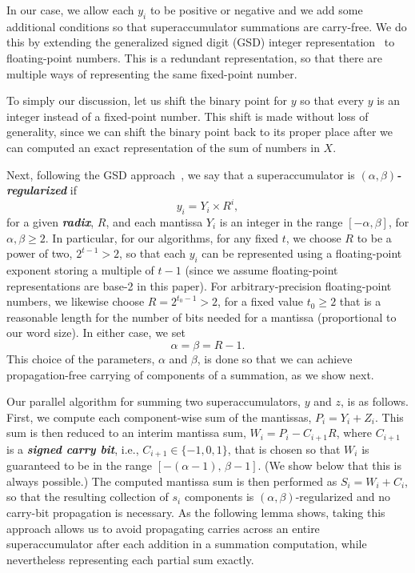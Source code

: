 \documentclass[11pt]{article}
\renewcommand{\emph}[1]{\textit{\textbf{#1}}}
\begin{document}
In our case, 
we allow each $y_i$ to be positive or negative and we 
add some additional conditions so that 
superaccumulator summations are carry-free.
We do this by extending the generalized signed digit (GSD) 
integer representation~\cite{P46283} to floating-point numbers.
This is a redundant representation, so that there are multiple
ways of representing the same fixed-point number.

To simply our discussion, let us shift the binary point for $y$ so that every
$y$ is an integer instead of a fixed-point number.
This shift is made without loss of generality, since we can shift
the binary point back to its proper place after we can computed an
exact representation of the sum of numbers in $X$.

Next, following the GSD approach~\cite{P46283},
we say that a superaccumulator is \emph{$(\alpha,\beta)$-regularized} if
\[
y_i = Y_i \times R^i,
\]
for a given \emph{radix}, $R$,
and each mantissa $Y_i$ is an integer in the range $[-\alpha,\beta]$,
for $\alpha,\beta\ge 2$.
In particular, for our algorithms, for any fixed $t$,
we choose $R$ to be a power of two, $2^{t-1}>2$, 
so that each $y_i$ can be represented using a
floating-point exponent storing a multiple of $t-1$ 
(since we assume floating-point 
representations are base-2 in this paper).
For arbitrary-precision floating-point numbers, we likewise choose 
$R=2^{t_0-1}>2$,
for a fixed value $t_0\ge 2$ that is a reasonable length 
for the number of bits needed for a mantissa (proportional to our word size).
In either case, we set
\[
\alpha = \beta = R-1.
\]
This choice of the parameters, $\alpha$ and $\beta$, 
is done so that we can achieve
propagation-free carrying of components of a summation, as we show next.

Our parallel algorithm for summing two
superaccumulators, $y$ and $z$, is as follows.
First, we compute each component-wise sum of the mantissas, 
$P_i = Y_i+Z_i$. 
This sum is then reduced to
an interim mantissa sum, $W_i=P_i-C_{i+1}R$, where $C_{i+1}$ is a
\emph{signed carry bit}, i.e., $C_{i+1}\in\{-1,0,1\}$,
that is chosen
so that $W_i$ is guaranteed to be in the range $[-(\alpha-1),\,\beta-1]$.
(We show below that this is always possible.)
The computed mantissa sum is 
then performed as
$S_i = W_i + C_i$, so that the resulting collection of $s_i$ components
is $(\alpha,\beta)$-regularized and no carry-bit propagation is necessary.
As the following lemma shows,
taking this approach allows us to avoid propagating carries across
an entire superaccumulator after each addition in a summation computation,
while nevertheless representing each partial sum exactly.
\end{document}
